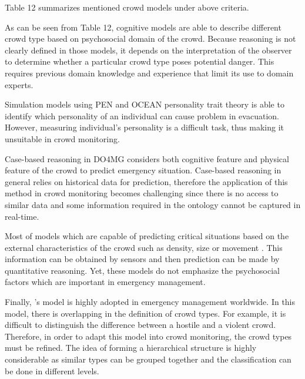 Table 12 summarizes mentioned crowd models under above criteria. 

As can be seen from Table 12, cognitive models \citep{Blumer1951,Lofland1985,Momboisse1967} are able to describe different crowd type based on psychosocial domain of the crowd. Because reasoning is not clearly defined in those models, it depends on the interpretation of the observer to determine whether a particular crowd type poses potential danger. This requires previous domain knowledge and experience that limit its use to domain experts.

Simulation models using PEN \citep{Guy2011} and OCEAN \citep{Durupinar2008} personality trait theory is able to identify which personality of an individual can cause problem in evacuation. However, measuring individual’s personality is a difficult task, thus making it unsuitable in crowd monitoring.

Case-based reasoning in DO4MG \citep{DelirHaghighi2013a} considers both cognitive feature and physical feature of the crowd to predict emergency situation. Case-based reasoning in general relies on historical data for prediction, therefore the application of this method in crowd monitoring becomes challenging since there is no access to similar data and some information required in the ontology cannot be captured in real-time.

Most of models which are capable of predicting critical situations based on the external characteristics of the crowd such as density, size or movement \citep{Helbing2007,Lee2005}. This information can be obtained by sensors and then prediction can be made by quantitative reasoning. Yet, these models do not emphasize the psychosocial factors which are important in emergency management.

Finally, \citet{Berlonghi1995}’s model is highly adopted in emergency management worldwide. In this model, there is overlapping in the definition of crowd types. For example, it is difficult to distinguish the difference between a hostile and a violent crowd. Therefore, in order to adapt this model into crowd monitoring, the crowd types must be refined. The idea of forming a hierarchical structure \citep{Brown1954,Forsyth2009} is highly considerable as similar types can be grouped together and the classification can be done in different levels.

